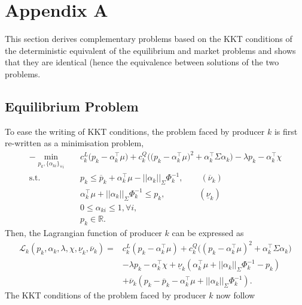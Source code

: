 \documentclass{article}
\begin{document}
\section*{Appendix A}
This section derives complementary problems based on the KKT conditions of the deterministic equivalent of the equilibrium and market problems and shows that they are identical (hence the equivalence between solutions of the two problems.

\subsection*{Equilibrium Problem}
To ease the writing of KKT conditions, the problem faced by producer $k$ is first re-written as a minimisation problem,
\begin{align}
-\underset{p_k, \{\alpha_{ki}\}_{\forall i}}{\min} \hspace{10pt} &  c_k^L\big(p_k - \alpha_k^\top \mu\big) + c_k^Q \Big(\big(p_k - \alpha_{k}^\top \mu \big)^2 + \alpha_k^\top \Sigma \alpha_k\Big) - \lambda p_k - \alpha_k^\top \chi\\
\mbox{s.t. } & p_k \le \overline{p}_k + \alpha_k^\top \mu - ||\alpha_k||_{\Sigma} \Phi_k^{-1}, \hspace{25pt} (\overline{\nu}_k)\\
& \alpha_k^\top \mu + ||\alpha_k||_{\Sigma}\Phi_k^{-1} \le p_k, \hspace{48pt}(\underline{\nu}_k)\\
& 0 \le \alpha_{ki} \le 1, \forall i,\\
& p_k \in \mathbb{R}.
\end{align}
Then, the Lagrangian function of producer $k$ can be expressed as
\begin{align*}
\mathcal{L}_k(p_k, \alpha_k, \lambda, \chi, \underline{\nu}_k, \overline{\nu}_k) =& c_k^L(p_k - \alpha_k^\top \mu) + c_k^Q \big((p_k - \alpha_k^\top \mu)^2 + \alpha_k^\top \Sigma \alpha_k\big)\\
&- \lambda p_k - \alpha_k^\top \chi + \underline{\nu}_k(\alpha_k^\top \mu + ||\alpha_k||_{\Sigma} \Phi_k^{-1} - p_k)\\
&+ \overline{\nu}_k (p_k - \overline{p}_k - \alpha_k^\top \mu + ||\alpha_k||_{\Sigma} \Phi_k^{-1}).
\end{align*}
The KKT conditions of the problem faced by producer $k$ now follow
\end{document}
